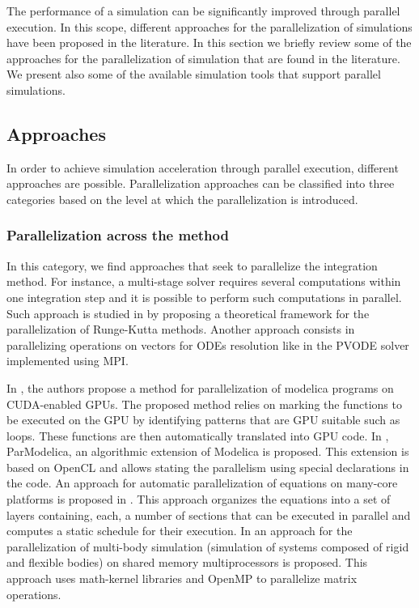 The performance of a simulation can be significantly improved through parallel execution. In this scope, different approaches for the parallelization of simulations have been proposed in the literature. In this section we briefly review some of the approaches for the parallelization of simulation that are found in the literature. We present also some of the available simulation tools that support parallel simulations.

\subsection{\label{subsec:parsimaprr}Approaches}

In order to achieve simulation acceleration through parallel execution, different approaches are possible. Parallelization approaches can be classified into three categories based on the level at which the parallelization is introduced.

\subsubsection{Parallelization across the method}
In this category, we find approaches that seek to parallelize the integration method. For instance, a multi-stage solver requires several computations within one integration step and it is possible to perform such computations in parallel. Such approach is studied in \cite{iserles:1990} by proposing a theoretical framework for the parallelization of Runge-Kutta methods. Another approach consists in parallelizing operations on vectors for ODEs resolution like in the PVODE solver \cite{byrne:1999} implemented using MPI. 

In \cite{elmqvist:2015}, the authors propose a method for parallelization of modelica programs on CUDA-enabled GPUs. The proposed method relies on marking the functions to be executed on the GPU by identifying patterns that are GPU suitable such as loops. These functions are then automatically translated into GPU code. In \cite{Gebremedhin2012}, ParModelica, an algorithmic extension of Modelica is proposed. This extension is based on OpenCL and allows stating the parallelism using special declarations in the code. An approach for automatic parallelization of equations on many-core platforms is proposed in \cite{elmqvist:2014}. This approach organizes the equations into a set of layers containing, each, a number of sections that can be executed in parallel and computes a static schedule for their execution. In \cite{clauberg:2012} an approach for the parallelization of multi-body simulation (simulation of systems composed of rigid and flexible bodies) on shared memory multiprocessors is proposed. This approach uses math-kernel libraries and OpenMP to parallelize matrix operations.

